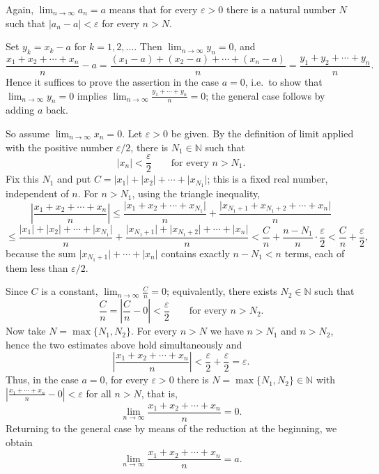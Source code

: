 \documentclass[11pt,a4paper]{article}
\newenvironment{solution}[1]{%
  \par\addvspace{1.7ex}%
  \noindent{\color{solutioncolor}\textbf{#1}}\hspace{0.55em}\ignorespaces}%
  {\par\addvspace{0.9ex}}
\begin{document}
\begin{solution}{Solution 2.1.4}\label{es:2.1.4}
Again, $\displaystyle\lim_{n\to\infty}a_{n}=a$ means that for every $\varepsilon>0$ there is a natural number $N$ such that $\lvert a_{n}-a\rvert<\varepsilon$ for every $n>N$.

Set $y_{k}=x_{k}-a$ for $k=1,2,\dots$. Then $\displaystyle\lim_{n\to\infty}y_{n}=0$, and
\[
\frac{x_{1}+x_{2}+\cdots+x_{n}}{n}-a
=\frac{(x_{1}-a)+(x_{2}-a)+\cdots+(x_{n}-a)}{n}
=\frac{y_{1}+y_{2}+\cdots+y_{n}}{n}.
\]
Hence it suffices to prove the assertion in the case $a=0$, i.e.\ to show that $\displaystyle\lim_{n\to\infty}y_{n}=0$ implies $\displaystyle\lim_{n\to\infty}\frac{y_{1}+\cdots+y_{n}}{n}=0$; the general case follows by adding $a$ back.

So assume $\displaystyle\lim_{n\to\infty}x_{n}=0$. Let $\varepsilon>0$ be given. By the definition of limit applied with the positive number $\varepsilon/2$, there is $N_{1}\in\mathbb{N}$ such that
\[
\lvert x_{n}\rvert<\frac{\varepsilon}{2}\qquad\text{for every } n>N_{1}.
\]
Fix this $N_{1}$ and put $C=\lvert x_{1}\rvert+\lvert x_{2}\rvert+\cdots+\lvert x_{N_{1}}\rvert$; this is a fixed real number, independent of $n$. For $n>N_{1}$, using the triangle inequality,
\[
\left\lvert\frac{x_{1}+x_{2}+\cdots+x_{n}}{n}\right\rvert
\le\frac{\lvert x_{1}+x_{2}+\cdots+x_{N_{1}}\rvert}{n}
+\frac{\lvert x_{N_{1}+1}+x_{N_{1}+2}+\cdots+x_{n}\rvert}{n}
\]
\[
\le\frac{\lvert x_{1}\rvert+\lvert x_{2}\rvert+\cdots+\lvert x_{N_{1}}\rvert}{n}
+\frac{\lvert x_{N_{1}+1}\rvert+\lvert x_{N_{1}+2}\rvert+\cdots+\lvert x_{n}\rvert}{n}
<\frac{C}{n}+\frac{n-N_{1}}{n}\cdot\frac{\varepsilon}{2}
<\frac{C}{n}+\frac{\varepsilon}{2},
\]
because the sum $\lvert x_{N_{1}+1}\rvert+\cdots+\lvert x_{n}\rvert$ contains exactly $n-N_{1}<n$ terms, each of them less than $\varepsilon/2$.

Since $C$ is a constant, $\displaystyle\lim_{n\to\infty}\frac{C}{n}=0$; equivalently, there exists $N_{2}\in\mathbb{N}$ such that
\[
\frac{C}{n}=\left\lvert\frac{C}{n}-0\right\rvert<\frac{\varepsilon}{2}\qquad\text{for every } n>N_{2}.
\]
Now take $N=\max\{N_{1},N_{2}\}$. For every $n>N$ we have $n>N_{1}$ and $n>N_{2}$, hence the two estimates above hold simultaneously and
\[
\left\lvert\frac{x_{1}+x_{2}+\cdots+x_{n}}{n}\right\rvert<\frac{\varepsilon}{2}+\frac{\varepsilon}{2}=\varepsilon .
\]
Thus, in the case $a=0$, for every $\varepsilon>0$ there is $N=\max\{N_{1},N_{2}\}\in\mathbb{N}$ with $\left\lvert\frac{x_{1}+\cdots+x_{n}}{n}-0\right\rvert<\varepsilon$ for all $n>N$, that is,
\[
\lim_{n\to\infty}\frac{x_{1}+x_{2}+\cdots+x_{n}}{n}=0 .
\]
Returning to the general case by means of the reduction at the beginning, we obtain
\[
\lim_{n\to\infty}\frac{x_{1}+x_{2}+\cdots+x_{n}}{n}=a .
\]
\end{solution}
\end{document}
